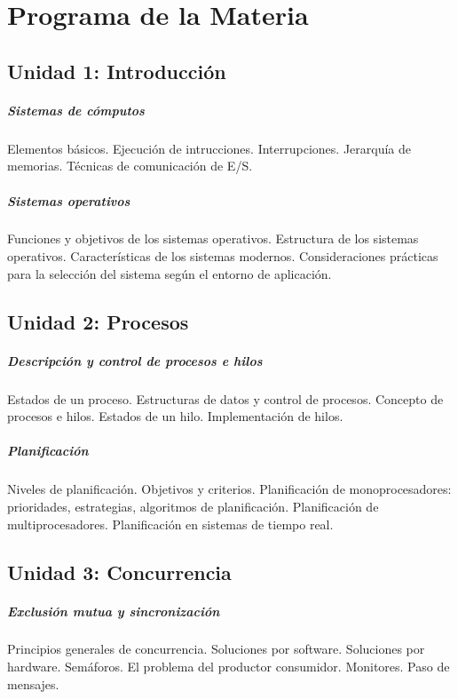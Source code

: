 \chapter*{Programa de la Materia}

\section*{Unidad 1: Introducción}

\paragraph*{Sistemas de cómputos} Elementos básicos. Ejecución de intrucciones. Interrupciones. Jerarquía de memorias. Técnicas de comunicación de E/S.

\paragraph*{Sistemas operativos} Funciones y objetivos de los sistemas operativos. Estructura de los sistemas operativos. Características de los sistemas modernos. Consideraciones prácticas para la selección del sistema según el entorno de aplicación.

\section*{Unidad 2: Procesos}

\paragraph*{Descripción y control de procesos e hilos} Estados de un proceso. Estructuras de datos y control de procesos. Concepto de procesos e hilos. Estados de un hilo. Implementación de hilos.

\paragraph*{Planificación} Niveles de planificación. Objetivos y criterios. Planificación de monoprocesadores: prioridades, estrategias, algoritmos de planificación. Planificación de multiprocesadores. Planificación en sistemas de tiempo real.

\section*{Unidad 3: Concurrencia}

\paragraph*{Exclusión mutua y sincronización} Principios generales de concurrencia. Soluciones por software. Soluciones por hardware. Semáforos. El problema del productor consumidor. Monitores. Paso de mensajes.

